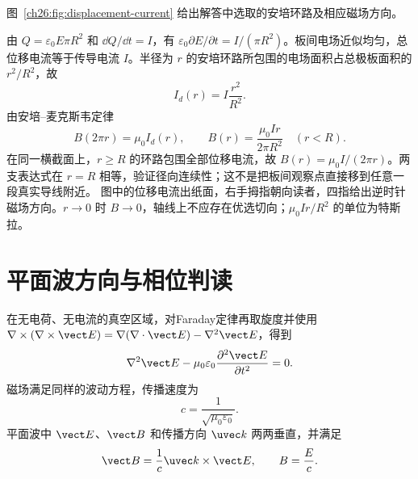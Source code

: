 \begin{xesolution}
图~\ref{ch26:fig:displacement-current} 给出解答中选取的安培环路及相应磁场方向。
\begin{center}
\label{ch26:fig:displacement-current}
\end{center}

由 $Q=\varepsilon_0E\pi R^2$ 和 $\dd Q/\dd t=I$，有 $\varepsilon_0\partial E/\partial t=I/(\pi R^2)$。板间电场近似均匀，总位移电流等于传导电流 $I$。半径为 $r$ 的安培环路所包围的电场面积占总极板面积的 $r^2/R^2$，故
\[
 I_d(r)=I\frac{r^2}{R^2}.
\]
由安培--麦克斯韦定律
\[
 B(2\pi r)=\mu_0I_d(r),
 \qquad
 \boxed{B(r)=\frac{\mu_0Ir}{2\pi R^2}\quad(r<R)}.
\]
在同一横截面上，$r\ge R$ 的环路包围全部位移电流，故 $B(r)=\mu_0I/(2\pi r)$。两支表达式在 $r=R$ 相等，验证径向连续性；这不是把板间观察点直接移到任意一段真实导线附近。
图中的位移电流出纸面，右手拇指朝向读者，四指给出逆时针磁场方向。$r\to0$ 时 $B\to0$，轴线上不应存在优选切向；$\mu_0Ir/R^2$ 的单位为特斯拉。
\end{xesolution}

\section{平面波方向与相位判读}

在无电荷、无电流的真空区域，对Faraday定律再取旋度并使用
$\nabla\times(\nabla\times\vect E)=\nabla(\nabla\cdot\vect E)-\nabla^2\vect E$，得到
\begin{equation}
 \nabla^2\vect E-\mu_0\varepsilon_0\frac{\partial^2\vect E}{\partial t^2}=0.
\end{equation}
磁场满足同样的波动方程，传播速度为
\begin{equation}
 c=\frac1{\sqrt{\mu_0\varepsilon_0}}.
\end{equation}
平面波中 $\vect E$、$\vect B$ 和传播方向 $\uvec k$ 两两垂直，并满足
\begin{equation}
 \vect B=\frac1c\uvec k\times\vect E,
 \qquad B=\frac Ec.
\end{equation}

